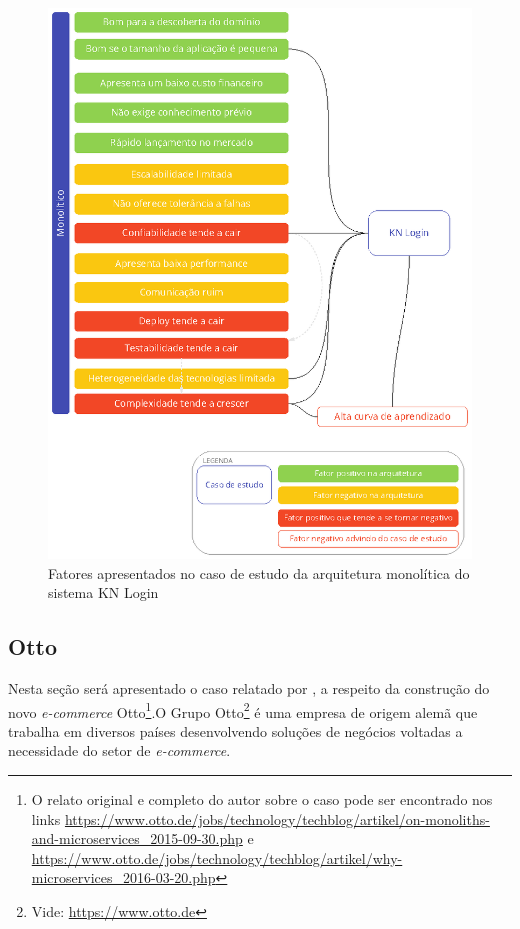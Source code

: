 \begin{figure}[h]
  \centering
  \includegraphics[keepaspectratio=true,scale=1]{figuras/analise-knlogin.eps}
  \caption{Fatores apresentados no caso de estudo da arquitetura monolítica do sistema KN Login\label{fig:monoKN}}
\end{figure}

\subsection{Otto}

Nesta seção será apresentado o caso relatado por  , a
respeito da construção do novo \textit{e-commerce} Otto\footnote{O relato original e completo do autor
sobre o caso pode ser encontrado nos links
\url{https://www.otto.de/jobs/technology/techblog/artikel/on-monoliths-and-microservices_2015-09-30.php}
e \url{https://www.otto.de/jobs/technology/techblog/artikel/why-microservices_2016-03-20.php}}.O Grupo
Otto\footnote{Vide: \url{https://www.otto.de}} é uma empresa de origem alemã que trabalha em diversos países
desenvolvendo soluções de negócios voltadas a necessidade do setor de \textit{e-commerce}.

